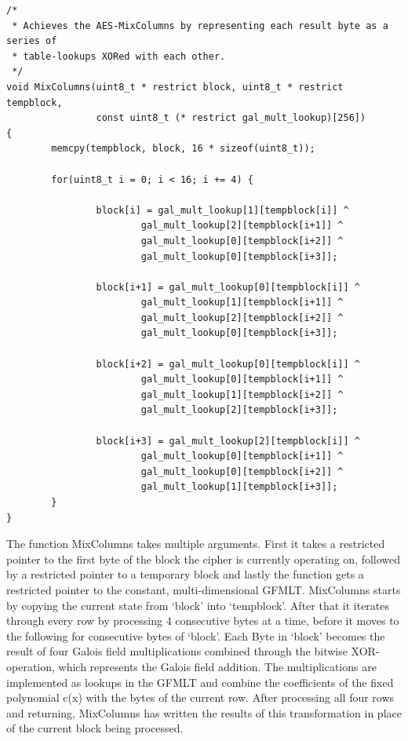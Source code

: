 \begin{lstlisting}
/*
 * Achieves the AES-MixColumns by representing each result byte as a series of
 * table-lookups XORed with each other.
 */
void MixColumns(uint8_t * restrict block, uint8_t * restrict tempblock,
                const uint8_t (* restrict gal_mult_lookup)[256])
{
        memcpy(tempblock, block, 16 * sizeof(uint8_t));

        for(uint8_t i = 0; i < 16; i += 4) {

                block[i] = gal_mult_lookup[1][tempblock[i]] ^
                        gal_mult_lookup[2][tempblock[i+1]] ^
                        gal_mult_lookup[0][tempblock[i+2]] ^
                        gal_mult_lookup[0][tempblock[i+3]];

                block[i+1] = gal_mult_lookup[0][tempblock[i]] ^
                        gal_mult_lookup[1][tempblock[i+1]] ^
                        gal_mult_lookup[2][tempblock[i+2]] ^
                        gal_mult_lookup[0][tempblock[i+3]];

                block[i+2] = gal_mult_lookup[0][tempblock[i]] ^
                        gal_mult_lookup[0][tempblock[i+1]] ^
                        gal_mult_lookup[1][tempblock[i+2]] ^
                        gal_mult_lookup[2][tempblock[i+3]];

                block[i+3] = gal_mult_lookup[2][tempblock[i]] ^
                        gal_mult_lookup[0][tempblock[i+1]] ^
                        gal_mult_lookup[0][tempblock[i+2]] ^
                        gal_mult_lookup[1][tempblock[i+3]];
        }
}
\end{lstlisting}

The function MixColumns takes multiple arguments. First it takes a
restricted pointer to the first byte of the block the cipher is
currently operating on, followed by a restricted pointer to a temporary
block and lastly the function gets a restricted pointer to the constant,
multi-dimensional GFMLT. MixColumns starts by copying the current state
from `block' into `tempblock'. After that it iterates through every row
by processing 4 consecutive bytes at a time, before it moves to the
following for consecutive bytes of `block'. Each Byte in `block' becomes
the result of four Galois field multiplications combined through the
bitwise XOR-operation, which represents the Galois field addition. The
multiplications are implemented as lookups in the GFMLT and combine the
coefficients of the fixed polynomial c(x) with the bytes of the current
row. After processing all four rows and returning, MixColumns has
written the results of this transformation in place of the current block
being processed.

